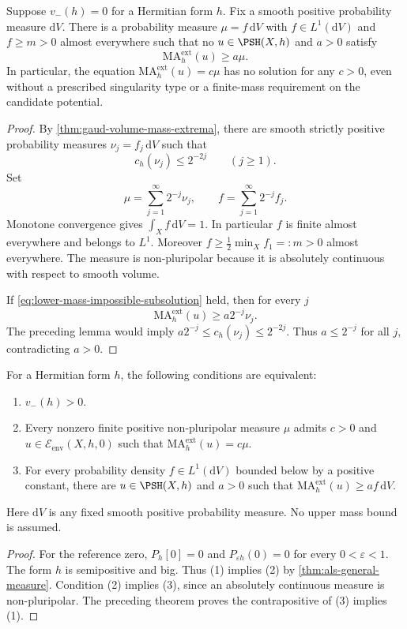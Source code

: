 \begin{theorem}\label{thm:lower-mass-obstructing-measure}
Suppose $v_-(h)=0$ for a Hermitian form $h$. Fix a smooth positive probability measure $\mathrm{d}V$. There is a probability measure $\mu=f\,\mathrm{d}V$ with $f\in L^1(\mathrm{d}V)$ and $f\geq m>0$ almost everywhere such that no $u\in\PSH(X,h)$ and $a>0$ satisfy
\begin{equation}\label{eq:lower-mass-impossible-subsolution}
 \mathrm{MA}^{\mathrm{ext}}_h(u)\geq a\mu.
\end{equation}
In particular, the equation $\mathrm{MA}^{\mathrm{ext}}_h(u)=c\mu$ has no solution for any $c>0$, even without a prescribed singularity type or a finite-mass requirement on the candidate potential.
\end{theorem}
\begin{proof}
By \cref{thm:gaud-volume-mass-extrema}, there are smooth strictly positive probability measures $\nu_j=f_j\,\mathrm{d}V$ such that
\[
 c_h(\nu_j)\leq 2^{-2j}\qquad(j\geq1).
\]
Set
\[
 \mu=\sum_{j=1}^{\infty}2^{-j}\nu_j,
 \qquad f=\sum_{j=1}^{\infty}2^{-j}f_j.
\]
Monotone convergence gives $\int_Xf\,\mathrm{d}V=1$. In particular $f$ is finite almost everywhere and belongs to $L^1$. Moreover
$f\geq\tfrac12\min_X f_1=:m>0$ almost everywhere. The measure is non-pluripolar because it is absolutely continuous with respect to smooth volume.

If \eqref{eq:lower-mass-impossible-subsolution} held, then for every $j$
\[
 \mathrm{MA}^{\mathrm{ext}}_h(u)\geq a2^{-j}\nu_j.
\]
The preceding lemma would imply $a2^{-j}\leq c_h(\nu_j)\leq2^{-2j}$. Thus $a\leq2^{-j}$ for all $j$, contradicting $a>0$.
\end{proof}

\begin{corollary}\label{cor:positive-lower-mass-solvability}
For a Hermitian form $h$, the following conditions are equivalent:
\begin{enumerate}
\item $v_-(h)>0$.
\item Every nonzero finite positive non-pluripolar measure $\mu$ admits $c>0$ and $u\in\mathcal E_{\mathrm{env}}(X,h,0)$ such that
$\mathrm{MA}^{\mathrm{ext}}_h(u)=c\mu$.
\item For every probability density $f\in L^1(\mathrm{d}V)$ bounded below by a positive constant, there are $u\in\PSH(X,h)$ and $a>0$ such that
$\mathrm{MA}^{\mathrm{ext}}_h(u)\geq af\,\mathrm{d}V$.
\end{enumerate}
Here $\mathrm{d}V$ is any fixed smooth positive probability measure. No upper mass bound is assumed.
\end{corollary}
\begin{proof}
For the reference zero, $P_h[0]=0$ and $P_{\varepsilon h}(0)=0$ for every $0<\varepsilon<1$. The form $h$ is semipositive and big. Thus (1) implies (2) by \cref{thm:als-general-measure}. Condition (2) implies (3), since an absolutely continuous measure is non-pluripolar. The preceding theorem proves the contrapositive of (3) implies (1).
\end{proof}

